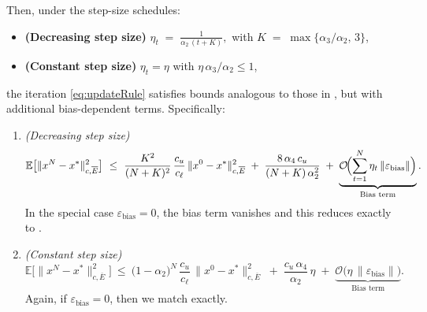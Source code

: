 \begin{theorem}
Then, under the step-size schedules:
\begin{itemize}
\item\textbf{(Decreasing step size)} 
  \(\displaystyle \eta_t \;=\;\frac{1}{\alpha_2\,(t+K)},\)
  with 
  \(\displaystyle K \;=\;\max\bigl\{\alpha_3/\alpha_2,\,3\bigr\}\),
\item\textbf{(Constant step size)} 
  \(\eta_t = \eta\) with \(\eta\,\alpha_3/\alpha_2 \le 1\),
\end{itemize}
the iteration \eqref{eq:updateRule} satisfies bounds analogous to those in \citep[Theorem\,3]{zhang2021finite}, but with additional bias-dependent terms. 
Specifically:

\begin{enumerate}
\item \emph{(Decreasing step size)} 
  \[
    \mathbb{E}\bigl[\|x^N - x^*\|_{c,\overline{E}}^2\bigr]
    ~\le~
    \frac{K^2}{(N+K)^2}\,\frac{c_u}{c_\ell}\,\|x^0 - x^*\|_{c,\overline{E}}^2
    \;+\;
    \frac{8\,\alpha_4\,c_u}{(N+K)\,\alpha_2^2}
    \;+\;
    \underbrace{\mathcal{O}\!\Bigl(\sum_{t=1}^N \eta_t\,\|\varepsilon_{\text{bias}}\|\Bigr)}_{\text{Bias term}}.
  \]
  In the special case \(\varepsilon_{\text{bias}}=0\), the bias term vanishes and this reduces exactly to \citep[Eq.\,(B.8)]{zhang2021finite}.

\item \emph{(Constant step size)} 
  \[
    \mathbb{E}\bigl[\|x^N - x^*\|_{c,\overline{E}}^2\bigr]
    ~\le~
    \bigl(1 - \alpha_2\bigr)^N \,\frac{c_u}{c_\ell}\,\|x^0 - x^*\|_{c,\overline{E}}^2
    \;+\;
    \frac{c_u\,\alpha_4}{\alpha_2}\,\eta
    \;+\;
    \underbrace{\mathcal{O}\!\bigl(\eta\,\|\varepsilon_{\text{bias}}\|\bigr)}_{\text{Bias term}}.
  \]
  Again, if \(\varepsilon_{\text{bias}}=0\), then we match \citep[Eq.\,(B.9)]{zhang2021finite} exactly.
\end{enumerate}


\end{theorem}
